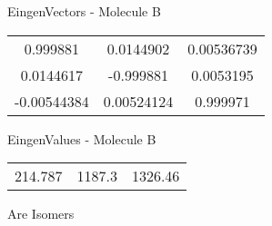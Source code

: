 \begin{multicols}{2}
\begin{center}
\vtab
 EingenVectors - Molecule B     \\
\vtab
\begin{tabular}{|c c c|}
0.999881	 & 	0.0144902	 & 	0.00536739	 \\
0.0144617	 & 	-0.999881	 & 	0.0053195	 \\
-0.00544384	 & 	0.00524124	 & 	0.999971
\end{tabular}

\vtab
 EingenValues - Molecule B     \\
\vtab
\begin{tabular}{|c c c|}
214.787	 & 	1187.3	 & 	1326.46
\end{tabular}

\end{center}
\end{multicols}
\begin{center}
\vtab
\vtab
\textcolor{NavyBlue}{\Large Are Isomers}
\end{center}
\newpage

